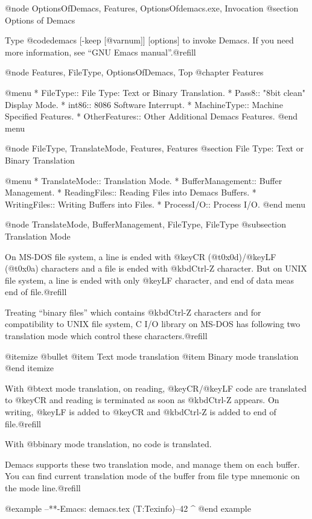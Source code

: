 @node OptionsOfDemacs, Features, OptionsOfdemacs.exe, Invocation
@section Options of Demacs

Type @code{demacs [-keep [@var{num}]] [options]} to invoke Demacs. If
you need more information, see ``GNU Emacs manual''.@refill


@node Features, FileType, OptionsOfDemacs, Top
@chapter Features

@menu
* FileType::       File Type: Text or Binary Translation.
* Pass8::          "8bit clean" Display Mode.
* int86::          8086 Software Interrupt.
* MachineType::    Machine Specified Features.
* OtherFeatures::  Other Additional Demacs Features.
@end menu


@node FileType, TranslateMode, Features, Features
@section File Type: Text or Binary Translation

@menu
* TranslateMode::     Translation Mode.
* BufferManagement::  Buffer Management.
* ReadingFiles::      Reading Files into Demacs Buffers.
* WritingFiles::      Writing Buffers into Files.
* ProcessI/O::        Process I/O.
@end menu


@node TranslateMode, BufferManagement, FileType, FileType
@subsection Translation Mode

On MS-DOS file system, a line is ended with @key{CR} (@t{0x0d})/@key{LF}
(@t{0x0a}) characters and a file is ended with @kbd{Ctrl-Z} character. 
But on UNIX file system, a line is ended with only @key{LF} character,
and end of data meas end of file.@refill

Treating ``binary files'' which contains @kbd{Ctrl-Z} characters and for
compatibility to UNIX file system, C I/O library on MS-DOS has following
two translation mode which control these characters.@refill

@itemize @bullet
@item
Text mode translation
@item
Binary mode translation
@end itemize

With @b{text mode translation}, on reading, @key{CR}/@key{LF} code are
translated to @key{CR} and reading is terminated as soon as @kbd{Ctrl-Z}
appears. On writing, @key{LF} is added to @key{CR} and @kbd{Ctrl-Z} is
added to end of file.@refill

With @b{binary mode translation}, no code is translated.

Demacs supports these two translation mode, and manage them on each
buffer. You can find current translation mode of the buffer from file
type mnemonic on the mode line.@refill

@example
--**-Emacs: demacs.tex   (T:Texinfo)--42%
                          ^
@end example

